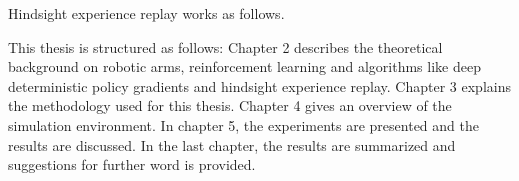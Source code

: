 \vspace{0.5cm}


Hindsight experience replay works as follows.


\vspace{0.5cm}





\vspace{0.5cm}




This thesis is structured as follows: 
Chapter 2 describes the theoretical background on robotic arms, reinforcement learning and algorithms like deep deterministic policy gradients and hindsight experience replay. 
Chapter 3 explains the methodology used for this thesis.
Chapter 4 gives an overview of the simulation environment.
In chapter 5, the experiments are presented and the results are discussed.
In the last chapter, the results are summarized and suggestions for further word is provided.




